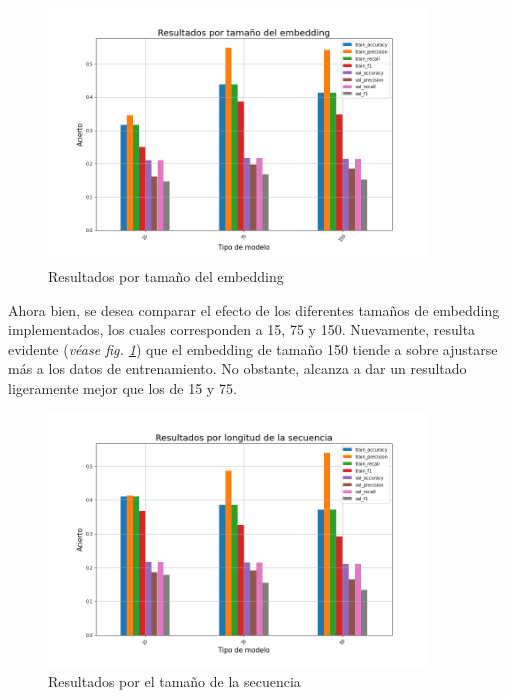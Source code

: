 \begin{figure}
    \centering
    \includegraphics[width=0.9\textwidth]{results/friends/deepModels/sim_res_deep_em_size.png}
    \caption{Resultados por tamaño del embedding}
    \label{fig:sim_deep_em_size}
\end{figure}

Ahora bien, se desea comparar el efecto de los diferentes tamaños de embedding implementados, los cuales corresponden a 15, 75 y 150. Nuevamente, resulta evidente (\textit{véase fig. \ref{fig:sim_deep_em_size}}) que el embedding de tamaño 150 tiende a sobre ajustarse más a los datos de entrenamiento. No obstante, alcanza a dar un resultado ligeramente mejor que los de 15 y 75.\\

\begin{figure}
    \centering
    \includegraphics[width=0.9\textwidth]{results/friends/deepModels/sim_res_deep_seq_len.png}
    \caption{Resultados por el tamaño de la secuencia}
    \label{fig:sim_deep_seq_len}
\end{figure}

